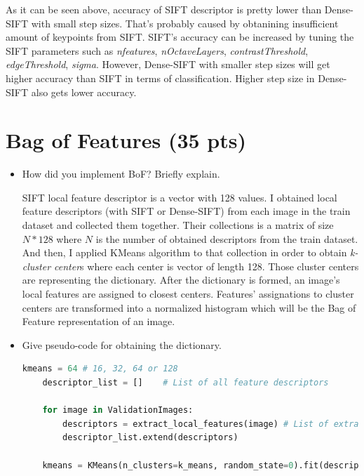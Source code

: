 \documentclass[12pt]{article}
\begin{document}
\begin{itemize}
		As it can be seen above, accuracy of SIFT descriptor is pretty lower than Dense-SIFT with small step sizes. That's probably caused by obtanining insufficient amount of keypoints from SIFT. SIFT's accuracy can be increased by tuning the SIFT parameters such as \textit{nfeatures}, \textit{nOctaveLayers}, \textit{contrastThreshold}, \textit{edgeThreshold}, \textit{sigma}. However, Dense-SIFT with smaller step sizes will get higher accuracy than SIFT in terms of classification. Higher step size in Dense-SIFT also gets lower accuracy.
    \end{itemize}


\section{Bag of Features (35 pts)}
    \begin{itemize}
        \item How did you implement BoF? Briefly explain.
        
		SIFT local feature descriptor is a vector with 128 values. I obtained local feature descriptors (with SIFT or Dense-SIFT) from each image in the train dataset and collected them together. Their collections is a matrix of size $N*128$ where $N$ is the number of obtained descriptors from the train dataset. And then, I applied KMeans algorithm to that collection in order to obtain \textit{k-cluster center}s where each center is vector of length 128. Those cluster centers are representing the dictionary. After the dictionary is formed, an image's local features are assigned to closest centers. Features' assignations to cluster centers are transformed into a normalized histogram which will be the Bag of Feature representation of an image.
        
        \item Give pseudo-code for obtaining the dictionary.
        
	        \begin{lstlisting}[language=Python]
	kmeans = 64	# 16, 32, 64 or 128
	descriptor_list = []	# List of all feature descriptors
	        	
	for image in ValidationImages:
		descriptors = extract_local_features(image)	# List of extracted feature descriptors of an image
		descriptor_list.extend(descriptors)
		
	kmeans = KMeans(n_clusters=k_means, random_state=0).fit(descriptor_list)	# or MiniBatchKMeans instead of KMeans, in order to obtain KMeans model
			\end{lstlisting}
        

\end{itemize}
\end{document}
